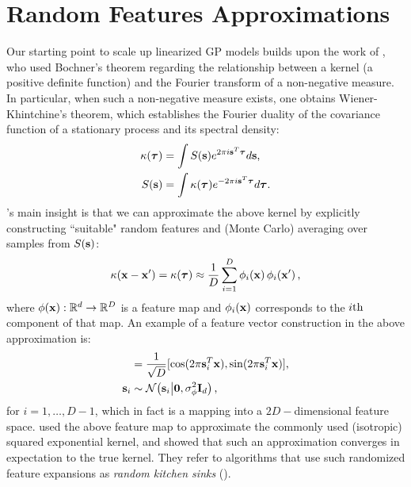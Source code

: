\section{Random Features Approximations}
%
Our starting point to scale up linearized GP models builds upon the work of 
\citeauthor{rahimi-recht-nips-2007} \citeyearpar{rahimi-recht-nips-2007,rahimi-recht-nips-2008},  
who used Bochner's theorem regarding the relationship between 
a kernel (a positive definite function) and the Fourier transform of a non-negative measure. In particular, 
when such a non-negative measure exists, one obtains  Wiener-Khintchine's theorem, which establishes  
 the Fourier duality of the covariance function of a stationary  process and its spectral density:
\begin{align}
	\label{eq:fourier}
	\kappa(\boldsymbol{ \tau }) &= \int S(\mathbf{s}) e^{2 \pi i \mathbf{s}^T  \boldsymbol{ \tau } } d \mathbf{s} \text{,} \\
	S(\mathbf{s}) &= \int \kappa(\boldsymbol{ \tau }) e^{- 2 \pi i \mathbf{s}^T \boldsymbol{ \tau } }  d \boldsymbol{ \tau } \text{.}
\end{align}
\citeauthor{rahimi-recht-nips-2007}'s  main insight  \citeyearpar{rahimi-recht-nips-2007} 
is that we can approximate the above kernel by explicitly constructing 
``suitable" random features and (Monte Carlo) averaging over samples from $S(\mathbf{s})$: 
\begin{equation}
	\label{eq:mcapprox}
	 \kappa(\mathbf{x}-\mathbf{x}^\prime) = \kappa(\boldsymbol{ \tau }) 
	\approx \frac{1}{D} \sum_{i=1}^{D} \phi_{i}\!\left({{\mathbf{x}}}\right) \phi_{i}\!\left({{\mathbf{x}^\prime}}\right)  \text{,}
\end{equation}
where $\phi\!\left({{\mathbf{x}}}\right): \mathbb{R}^{d} \to \mathbb{R}^{D}$ is a feature map and 
$\phi_{i}\!\left({{\mathbf{x}}}\right)$ corresponds to the $i\mathrm{th}$ component of that map.
%
An example of a feature vector construction in the above approximation is:
\begin{align}
	[\singlefeatfunc{\x}{i} ,\singlefeatfunc{\x}{i+1} ] &= \frac{1}{\sqrt{D}} [ \cos(2 \pi \ffourier_i^T \x) , \sin(2 \pi \ffourier_i^T \ins) ] \text{,}\\
		\ffourier_i & \sim \gausC{\ffourier_i}{\vec{0}, \varfeat \ident{d}} \text{,}
\end{align}
for $i=1, \ldots, D-1$,  which in fact is a mapping into a $2 D-$dimensional feature space. 
\citet{rahimi-recht-nips-2007} used the above feature map to approximate the commonly used 
(isotropic) squared exponential kernel, and showed that such an approximation
converges in expectation 
to the true kernel. They refer to algorithms that use such randomized feature expansions 
as \emph{random kitchen sinks} (\rks).  

